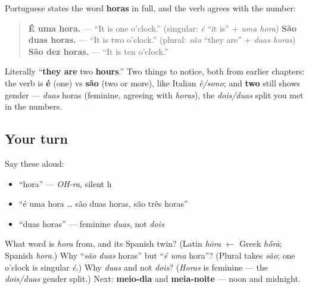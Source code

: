\begin{grammarlens}[title={Grammar Lens: \textquotedblleft{}é uma hora\textquotedblright{} but \textquotedblleft{}são duas horas\textquotedblright{}}]
Portuguese states the word \textbf{horas} in full, and the verb agrees with the number:

\begin{quote}
\textbf{É uma hora.} — \textquotedblleft{}It is one o'clock.\textquotedblright{} (singular: \emph{é} \textquotedblleft{}it is\textquotedblright{} + \emph{uma hora}) \textbf{São duas horas.} — \textquotedblleft{}It is two o'clock.\textquotedblright{} (plural: \emph{são} \textquotedblleft{}they are\textquotedblright{} + \emph{duas horas}) \textbf{São dez horas.} — \textquotedblleft{}It is ten o'clock.\textquotedblright{}
\end{quote}

Literally \textquotedblleft{}\textbf{they are} two \textbf{hours}.\textquotedblright{} Two things to notice, both from earlier chapters: the verb is \textbf{é} (one) vs \textbf{são} (two or more), like Italian \emph{è/sono}; and \textbf{two} still shows gender — \emph{duas} horas (feminine, agreeing with \emph{horas}), the \emph{dois/duas} split you met in the numbers.
\end{grammarlens}

\subsection*{Your turn}
Say these aloud:

\begin{itemize}
\raggedright
  \item \textquotedblleft{}hora\textquotedblright{} — \emph{OH-ra}, silent h
  \item \textquotedblleft{}é uma hora … são duas horas, são três horas\textquotedblright{}
  \item \textquotedblleft{}duas horas\textquotedblright{} — feminine \emph{duas}, not \emph{dois}
\end{itemize}

\begin{tcolorbox}[breakable,colback=teal!4,colframe=teal!35!black,title={Before you move on}]
What word is \emph{hora} from, and its Spanish twin? (Latin \emph{hōra} $\leftarrow$ Greek \emph{h\'{\={o}}rā}; Spanish \emph{hora}.) Why \textquotedblleft{}\emph{são duas} horas\textquotedblright{} but \textquotedblleft{}\emph{é uma} hora\textquotedblright{}? (Plural takes \emph{são}; one o'clock is singular \emph{é}.) Why \emph{duas} and not \emph{dois}? (\emph{Horas} is feminine — the \emph{dois/duas} gender split.) Next: \textbf{meio-dia} and \textbf{meia-noite} — noon and midnight.
\end{tcolorbox}
